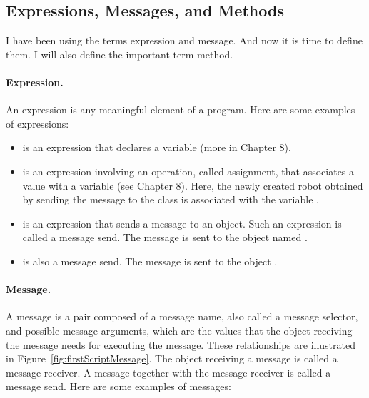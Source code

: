 \documentclass[a4paper,10pt,twoside]{book}
\begin{document}
\subsection{Expressions, Messages, and Methods}

I have been using the terms expression and message. And now it is time to define them. I will 
also define the important term method. 

\paragraph{Expression.}
An expression is any meaningful element of a program. Here are some examples of expressions: 
\begin{itemize} 
\item {} is an expression that declares a variable (more in Chapter 8). 

\item {} is an expression involving an operation, called assignment, that associates a value with a variable (see Chapter 8). Here, the newly created robot obtained by sending the message  to the class  is associated with the variable . 

\item {} is an expression that sends a message to an object. Such an expression is 
called a message send. The message  is sent to the object named . 

\item {} is also a message send. The message  is sent to the object . 
\end{itemize}

\paragraph{Message.} 
A message is a pair composed of a message name, also called a message selector, and possible 
message arguments, which are the values that the object receiving the message needs for executing 
the message. These relationships are illustrated in Figure~\ref{fig:firstScriptMessage}. The object receiving a 
message is called a message receiver. A message together with the message receiver is called a 
message send. Here are some examples of messages: 
\end{document}
